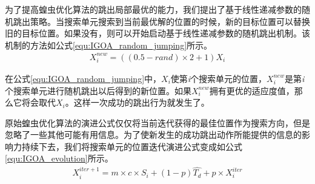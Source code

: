 为了提高蝗虫优化算法的跳出局部最优的能力，我们提出了基于线性递减参数的随机跳出策略。当搜索单元搜索到当前最优解的位置的时候，新的目标位置可以替换旧的目标位置。如果没有，则可以开始启动基于线性递减参数的随机跳出机制。该机制的方法如公式\ref{equ:IGOA_random_jumping}所示。
\begin{eqnarray}\label{equ:IGOA_random_jumping}
	X_i^{new}=((0.5-rand)\times 2+1)X_i 
\end{eqnarray}

在公式\ref{equ:IGOA_random_jumping}中，$X_i$使第\emph{i}个搜索单元的位置，$X_i^{new}$是第\emph{i}个搜索单元进行随机跳出以后得到的新位置。如果$X_i^{new}$拥有更优的适应度值，那么它将会取代$X_i$。这样一次成功的跳出行为就发生了。

原始蝗虫优化算法的演进公式仅仅将当前迭代获得的最佳位置作为搜索方向，但是忽略了一些其他可能有用信息。为了使新发生的成功跳出动作所能提供的信息的影响力持续下去，我们将搜索单元的位置迭代演进公式变成如公式\ref{equ:IGOA_evolution}所示。
\begin{eqnarray}\label{equ:IGOA_evolution}
	X_i^{iter+1}=m\times c\times S_i+(1-p)\widehat{T_d}+p\times X_i^{iter}
\end{eqnarray}

